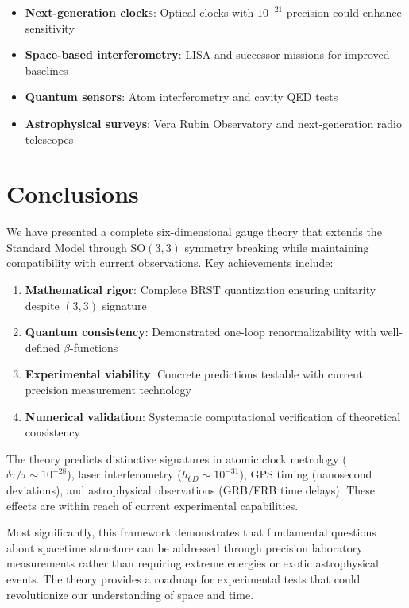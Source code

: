 \documentclass[12pt,a4paper]{article}
\newcommand{\SO}{\text{SO}}
\newcommand{\BRST}{\text{BRST}}
\begin{document}
\begin{itemize}
\item \textbf{Next-generation clocks}: Optical clocks with $10^{-21}$ precision could enhance sensitivity
\item \textbf{Space-based interferometry}: LISA and successor missions for improved baselines
\item \textbf{Quantum sensors}: Atom interferometry and cavity QED tests
\item \textbf{Astrophysical surveys}: Vera Rubin Observatory and next-generation radio telescopes
\end{itemize}

\section{Conclusions}

We have presented a complete six-dimensional gauge theory that extends the Standard Model through $\SO(3,3)$ symmetry breaking while maintaining compatibility with current observations. Key achievements include:

\begin{enumerate}
\item \textbf{Mathematical rigor}: Complete $\BRST$ quantization ensuring unitarity despite $(3,3)$ signature
\item \textbf{Quantum consistency}: Demonstrated one-loop renormalizability with well-defined $\beta$-functions
\item \textbf{Experimental viability}: Concrete predictions testable with current precision measurement technology
\item \textbf{Numerical validation}: Systematic computational verification of theoretical consistency
\end{enumerate}

The theory predicts distinctive signatures in atomic clock metrology ($\delta\tau/\tau \sim 10^{-28}$), laser interferometry ($h_{6D} \sim 10^{-31}$), GPS timing (nanosecond deviations), and astrophysical observations (GRB/FRB time delays). These effects are within reach of current experimental capabilities.

Most significantly, this framework demonstrates that fundamental questions about spacetime structure can be addressed through precision laboratory measurements rather than requiring extreme energies or exotic astrophysical events. The theory provides a roadmap for experimental tests that could revolutionize our understanding of space and time.
\end{document}
